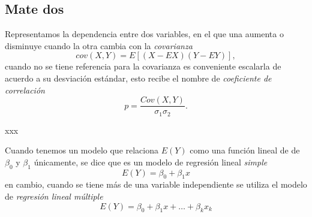 \subsection{Mate dos}
Representamos la dependencia entre dos variables, en el que una aumenta o disminuye cuando la otra cambia con la \emph{covarianza}
\begin{equation}
cov(X,Y)=E[(X-EX)(Y-EY)],
\end{equation}
cuando no se tiene referencia para la covarianza es conveniente escalarla de acuerdo a su desviación estándar, esto recibe el nombre de  \emph{coeficiente de correlación}
\begin{equation}
p=\frac{Cov(X,Y)}{\sigma_1\sigma_2}.
\end{equation}

xxx

Cuando tenemos un modelo que relaciona $E(Y)$ como una función lineal de de $\beta_0$ y $\beta_1$ únicamente, se dice que es un modelo de regresión lineal \emph{simple}
\begin{equation}
E(Y)=\beta_0+\beta_1x\end{equation}
en cambio, cuando se tiene más de una variable independiente se utiliza el modelo de \emph{regresión lineal múltiple}
\begin{equation}
E(Y)=\beta_0+\beta_1x+\ldots+\beta_kx_k
\end{equation}